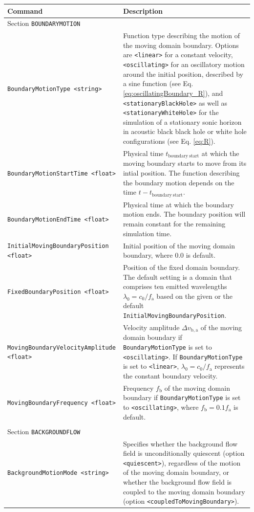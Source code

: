 \noindent
\begin{longtable}{p{} p{}}
\textbf{Command} & \textbf{Description}
\vspace{1mm} \\
\hline Section {\tt BOUNDARYMOTION} &\\ \hline
{\tt BoundaryMotionType <string>} & Function type describing the motion of the moving domain boundary. Options are {\tt <linear>} for a constant velocity, {\tt <oscillating>} for an oscillatory motion around the initial position, described by a sine function (see Eq. \eqref{eq:oscillatingBoundary_R}), and {\tt <stationaryBlackHole>} as well as {\tt <stationaryWhiteHole>} for the simulation of a stationary sonic horizon in acoustic black black hole or white hole configurations (see Eq. \eqref{eq:R}). \\
{\tt BoundaryMotionStartTime <float>} & Physical time $t_{\mathrm{boundary\:start}}$ at which the moving boundary starts to move from its intial position. The function describing the boundary motion depends on the time $t-t_{\mathrm{boundary\:start}}$. \\
{\tt BoundaryMotionEndTime <float>} & Physical time at which the boundary motion ends. The boundary position will remain constant for the remaining simulation time. \\
{\tt InitialMovingBoundaryPosition <float>} & Initial position of the moving domain boundary, where 0.0 is default. \\
{\tt FixedBoundaryPosition <float>} & Position of the fixed domain boundary. The default setting is a domain that comprises ten emitted wavelengths $\lambda_0=c_0/f_{\mathrm{a}}$ based on the given or the default {\tt InitialMovingBoundaryPosition}. \\
{\tt MovingBoundaryVelocityAmplitude <float>} & Velocity amplitude $\Delta v_{\mathrm{b,a}}$ of the moving domain boundary if {\tt BoundaryMotionType} is set to {\tt <oscillating>}. If {\tt BoundaryMotionType} is set to {\tt <linear>}, $\lambda_0=c_0/f_{\mathrm{a}}$ represents the constant boundary velocity. \\
{\tt MovingBoundaryFrequency <float>} & Frequency $f_{\mathrm{b}}$ of the moving domain boundary if {\tt BoundaryMotionType} is set to {\tt <oscillating>}, where $f_{\mathrm{b}} = 0.1f_{\mathrm{a}}$ is default. \\
\\
\hline Section {\tt BACKGROUNDFLOW} &\\ \hline
{\tt BackgroundMotionMode <string>} & Specifies whether the background flow field is unconditionally quiescent (option {\tt <quiescent>}), regardless of the motion of the moving domain boundary, or whether the background flow field is coupled to the moving domain boundary (option {\tt <coupledToMovingBoundary>}). \\

\end{longtable}
